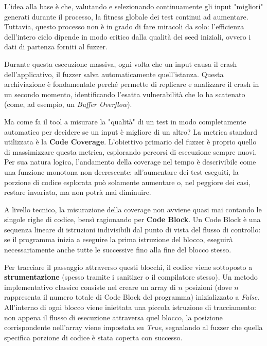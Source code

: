 L'idea alla base è che, valutando e selezionando continuamente gli input "migliori" 
generati durante il processo, la fitness globale dei test continui ad aumentare. 
Tuttavia, questo processo non è in grado di fare miracoli da solo: l'efficienza 
dell'intero ciclo dipende in modo critico dalla qualità dei seed iniziali, ovvero i 
dati di partenza forniti al fuzzer. 

Durante questa esecuzione massiva, ogni volta 
che un input causa il crash dell'applicativo, il fuzzer salva automaticamente 
quell'istanza. Questa archiviazione è fondamentale perché permette di replicare e 
analizzare il crash in un secondo momento, identificando l'esatta vulnerabilità che 
lo ha scatenato (come, ad esempio, un \textit{Buffer Overflow}). 

Ma come fa il tool a misurare la "qualità" di un test in modo completamente automatico per decidere se 
un input è migliore di un altro? La metrica standard utilizzata è la \textbf{Code Coverage}. 
L'obiettivo primario del fuzzer è proprio quello di massimizzare questa metrica, 
esplorando percorsi di esecuzione sempre nuovi. Per sua natura logica, l'andamento 
della coverage nel tempo è descrivibile come una funzione monotona non decrescente: 
all'aumentare dei test eseguiti, la porzione di codice esplorata può solamente 
aumentare o, nel peggiore dei casi, restare invariata, ma non potrà mai diminuire. 

A livello tecnico, la misurazione della coverage non avviene quasi mai contando le 
singole righe di codice, bensì ragionando per \textbf{Code Block}. Un Code Block è una 
sequenza lineare di istruzioni indivisibili dal punto di vista del flusso di 
controllo: se il programma inizia a eseguire la prima istruzione del blocco, 
eseguirà necessariamente anche tutte le successive fino alla fine del blocco stesso.

Per tracciare il passaggio attraverso questi blocchi, il codice viene sottoposto a 
\textbf{strumentazione} (spesso tramite i sanitizer o il compilatore stesso). Un 
metodo implementativo classico consiste nel creare un array di $n$ posizioni (dove $n$ 
rappresenta il numero totale di Code Block del programma) inizializzato a \textit{False}. 
All'interno di ogni blocco viene iniettata una piccola istruzione di tracciamento: 
non appena il flusso di esecuzione attraversa quel blocco, la posizione 
corrispondente nell'array viene impostata su \textit{True}, segnalando al fuzzer che 
quella specifica porzione di codice è stata coperta con successo.

